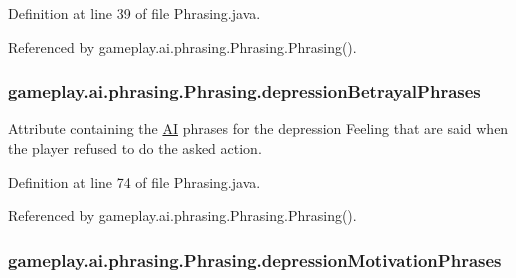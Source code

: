 Definition at line 39 of file Phrasing.\-java.



Referenced by gameplay.\-ai.\-phrasing.\-Phrasing.\-Phrasing().

\hypertarget{classgameplay_1_1ai_1_1phrasing_1_1_phrasing_a1ab28780f3cb894c496ebd26185493aa}{
\subsubsection[{depression\-Betrayal\-Phrases}]{ gameplay.\-ai.\-phrasing.\-Phrasing.\-depression\-Betrayal\-Phrases\hspace{0.3cm}{\ttfamily [protected]}}}\label{classgameplay_1_1ai_1_1phrasing_1_1_phrasing_a1ab28780f3cb894c496ebd26185493aa}


Attribute containing the \hyperlink{classgameplay_1_1ai_1_1_a_i}{A\-I} phrases for the depression Feeling that are said when the player refused to do the asked action. 



Definition at line 74 of file Phrasing.\-java.



Referenced by gameplay.\-ai.\-phrasing.\-Phrasing.\-Phrasing().

\hypertarget{classgameplay_1_1ai_1_1phrasing_1_1_phrasing_a7134cba12ee037a9737e6e5dcdc02ba8}{
\subsubsection[{depression\-Motivation\-Phrases}]{ gameplay.\-ai.\-phrasing.\-Phrasing.\-depression\-Motivation\-Phrases\hspace{0.3cm}{\ttfamily [protected]}}}\label{classgameplay_1_1ai_1_1phrasing_1_1_phrasing_a7134cba12ee037a9737e6e5dcdc02ba8}


